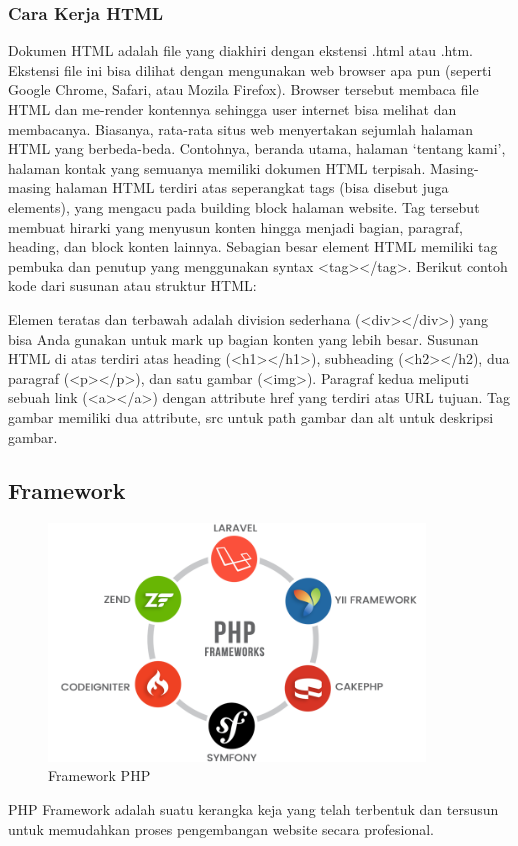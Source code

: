 \subsubsection{Cara Kerja HTML}
Dokumen HTML adalah file yang diakhiri dengan ekstensi .html atau .htm. Ekstensi file ini bisa dilihat dengan mengunakan web browser apa pun (seperti Google Chrome, Safari, atau Mozila Firefox). Browser tersebut membaca file HTML dan me-render kontennya sehingga user internet bisa melihat dan membacanya.
Biasanya, rata-rata situs web menyertakan sejumlah halaman HTML yang berbeda-beda. Contohnya, beranda utama, halaman ‘tentang kami’, halaman kontak yang semuanya memiliki dokumen HTML terpisah.
Masing-masing halaman HTML terdiri atas seperangkat tags (bisa disebut juga elements), yang mengacu pada building block halaman website. Tag tersebut membuat hirarki yang menyusun konten hingga menjadi bagian, paragraf, heading, dan block konten lainnya.
Sebagian besar element HTML memiliki tag pembuka dan penutup yang menggunakan syntax <tag></tag>.
Berikut contoh kode dari susunan atau struktur HTML:
	

Elemen teratas dan terbawah adalah division sederhana (<div></div>) yang bisa Anda gunakan untuk mark up bagian konten yang lebih besar.
Susunan HTML di atas terdiri atas heading (<h1></h1>), subheading (<h2></h2), dua paragraf (<p></p>), dan satu gambar (<img>).
Paragraf kedua meliputi sebuah link (<a></a>) dengan attribute href yang terdiri atas URL tujuan.
Tag gambar memiliki dua attribute, src untuk path gambar dan alt untuk deskripsi gambar.

	
	
	
	
	
\subsection{Framework}
	\begin{figure}[H]
		\includegraphics[width=10cm]{figures/web/phpframework.png}
		\centering
		\caption{Framework PHP}
	\end{figure}
PHP Framework adalah suatu kerangka keja yang telah terbentuk dan tersusun untuk memudahkan proses pengembangan website  secara profesional.

